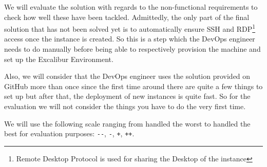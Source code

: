 



We will evaluate the solution with regards to the non-functional
requirements to check how well these have been tackled. Admittedly,
the only part of the final solution that has not been solved yet is to
automatically ensure SSH and RDP\footnote{Remote Desktop Protocol is
used for sharing the Desktop of the instance} access once the instance
is created.  So this is a step which the DevOps engineer needs to do
manually before being able to respectively provision the machine and
set up the Excalibur Environment.

Also, we will consider that the DevOps engineer uses the solution
provided on GitHub more than once since the first time around there
are quite a few things to set up but after that, the deployment of new
instances is quite fast. So for the evaluation we will not consider
the things you have to do the very first time.

We will use the following scale ranging from handled the worst to
handled the best for evaluation purposes: \verb|--|, \verb|-|,
\verb|+|, \verb|++|.

